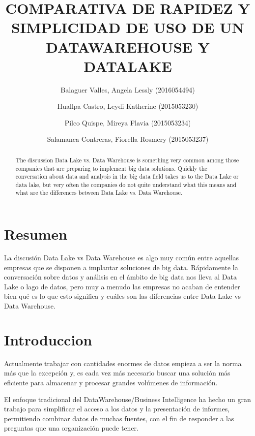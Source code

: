 \documentclass[preprint,12pt]{elsarticle}
\begin{document}
	
	\begin{frontmatter}

		\title{\huge COMPARATIVA DE RAPIDEZ Y SIMPLICIDAD DE USO DE UN DATAWAREHOUSE Y DATALAKE}
		
		\author{Balaguer Valles, Angela Lessly               (2016054494)}
		\author{Huallpa Castro, Leydi Katherine	      (2015053230)}
		\author{Pilco Quispe, Mireya Flavia		      (2015053234)}
		\author{Salamanca Contreras, Fiorella Rosmery (2015053237)}
		
		\address{Tacna, Perú}
		
		\begin{abstract}
The discussion Data Lake vs. Data Warehouse is something very common among those companies that are preparing to implement big data solutions. Quickly the conversation about data and analysis in the big data field takes us to the Data Lake or data lake, but very often the companies do not quite understand what this means and what are the differences between Data Lake vs. Data Warehouse.
		\end{abstract}
\end{frontmatter}
	
	\section{Resumen}

La discusión Data Lake vs Data Warehouse es algo muy común entre aquellas empresas que se disponen a implantar soluciones de big data. Rápidamente la conversación sobre datos y análisis en el ámbito de big data nos lleva al Data Lake o lago de datos, pero muy a menudo las empresas no acaban de entender bien qué es lo que esto significa y cuáles son las diferencias entre Data Lake vs Data Warehouse.

	
\section{Introduccion}
Actualmente trabajar con cantidades enormes de datos empieza a ser la norma más que la excepción y, es cada vez más necesario buscar una solución más eficiente para almacenar y procesar grandes volúmenes de información.

El enfoque tradicional del DataWarehouse/Business Intelligence ha hecho un gran trabajo para simplificar el acceso a los datos y la presentación de informes, permitiendo combinar datos de muchas fuentes, con el fin de responder a las preguntas que una organización puede tener.
\end{document}
